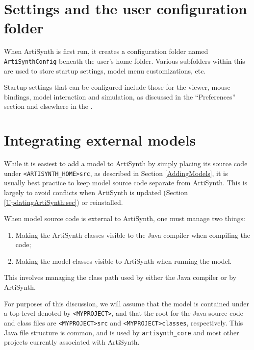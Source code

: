 \section{Settings and the user configuration folder}
\label{UserConfigFolder:sec}

When ArtiSynth is first run, it creates a configuration folder named
{\tt ArtiSynthConfig} beneath the user's home folder. Various
subfolders within this are used to store startup settings, model menu
customizations, etc.

Startup settings that can be configured include those for the viewer,
mouse bindings, model interaction and simulation, as discussed in the
``Preferences'' section and elsewhere in the
.

\section{Integrating external models}
\label{IntegratingExternalModels}

While it is easiest to add a model to ArtiSynth by simply placing its
source code under {\tt <ARTISYNTH\_HOME>\SEP src}, as described in
Section \ref{AddingModels}, it is usually best practice to keep model
source code separate from ArtiSynth. This is largely to avoid
conflicts when ArtiSynth is updated (Section \ref{UpdatingArtiSynth:sec})
or reinstalled.

When model source code is external to ArtiSynth, one must manage two
things:

\begin{enumerate}

\item Making the ArtiSynth classes visible to the Java compiler
when compiling the code;

\item Making the model classes visible to ArtiSynth when running
the model.

\end{enumerate}

This involves managing the class path used by either the Java compiler
or by ArtiSynth.

For purposes of this discussion, we will assume that the model is
contained under a top-level \directory{} denoted by {\tt <MYPROJECT>},
and that the root \directories{} for the Java source code and class
files are {\tt <MYPROJECT>\SEP src} and
\pdfbreak
{\tt <MYPROJECT>\SEP classes}, respectively. This Java file structure
is common, and is used by {\tt artisynth\_core} and most other
projects currently associated with ArtiSynth.

